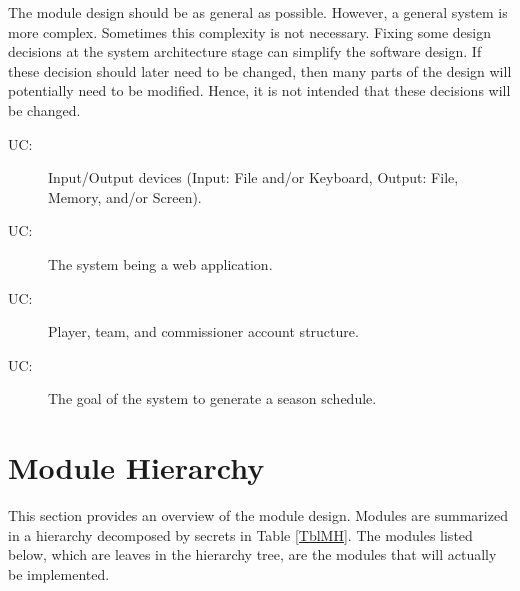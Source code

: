 \documentclass[12pt, titlepage]{article}
\newcounter{ucnum}
\newcommand{\uctheucnum}{UC\theucnum}
\begin{document}
The module design should be as general as possible. However, a general system is
more complex. Sometimes this complexity is not necessary. Fixing some design
decisions at the system architecture stage can simplify the software design. If
these decision should later need to be changed, then many parts of the design
will potentially need to be modified. Hence, it is not intended that these
decisions will be changed.

\begin{description}
  \item[ \uctheucnum \label{ucIO}:] Input/Output devices
  (Input: File and/or Keyboard, Output: File, Memory, and/or Screen).
  \item[ \uctheucnum \label{ucWeb}:] The system being a
  web application.
  \item[ \uctheucnum \label{ucAccStr}:] Player, team,
  and commissioner account structure.
  \item[ \uctheucnum \label{ucSched}:] The goal of the
  system to generate a season schedule.
\end{description}

\section{Module Hierarchy} \label{SecMH}

This section provides an overview of the module design. Modules are summarized
in a hierarchy decomposed by secrets in Table \ref{TblMH}. The modules listed
below, which are leaves in the hierarchy tree, are the modules that will
actually be implemented.
\end{document}
